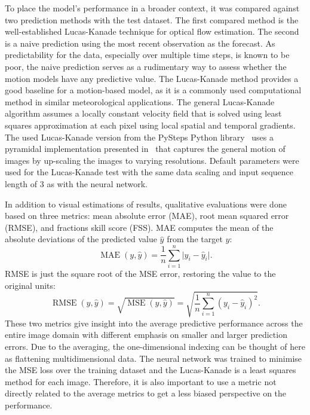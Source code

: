 To place the model's performance in a broader context, it was compared against two prediction methods with the test dataset.
The first compared method is the well-established Lucas-Kanade technique for optical flow estimation.
The second is a naive prediction using the most recent observation as the forecast.
As predictability for the data, especially over multiple time steps, is known to be poor, the naive prediction serves as a rudimentary way to assess whether the motion models have any predictive value.
The Lucas-Kanade method provides a good baseline for a motion-based model, as it is a commonly used computational method in similar meteorological applications.
The general Lucas-Kanade algorithm assumes a locally constant velocity field that is solved using least squares approximation at each pixel using local spatial and temporal gradients.
The used Lucas-Kanade version from the PySteps Python library~\cite{lucaskanade} uses a pyramidal implementation presented in~\cite{pyramidallk} that captures the general motion of images by up-scaling the images to varying resolutions.
Default parameters were used for the Lucas-Kanade test with the same data scaling and input sequence length of 3 as with the neural network.

In addition to visual estimations of results, qualitative evaluations were done based on three metrics: mean absolute error (MAE), root mean squared error (RMSE), and fractions skill score (FSS).
MAE computes the mean of the absolute deviations of the predicted value $\hat{y}$ from the target $y$:
\begin{equation*}
    \operatorname{MAE}(y, \hat{y}) = \frac{1}{n} \sum_{i=1}^{n} \vert y_i - \hat{y}_i \vert.
\end{equation*}
RMSE is just the square root of the MSE error, restoring the value to the original units:
\begin{equation*}
    \operatorname{RMSE}(y, \hat{y}) = \sqrt{\operatorname{MSE}(y, \hat{y})} = \sqrt{\frac{1}{n} \sum_{i=1}^{n} (y_i - \hat{y}_i)^2}.
\end{equation*}
These two metrics give insight into the average predictive performance across the entire image domain with different emphasis on smaller and larger prediction errors.
Due to the averaging, the one-dimensional indexing can be thought of here as flattening multidimensional data.
The neural network was trained to minimise the MSE loss over the training dataset and the Lucas-Kanade is a least squares method for each image.
Therefore, it is also important to use a metric not directly related to the average metrics to get a less biased perspective on the performance.

